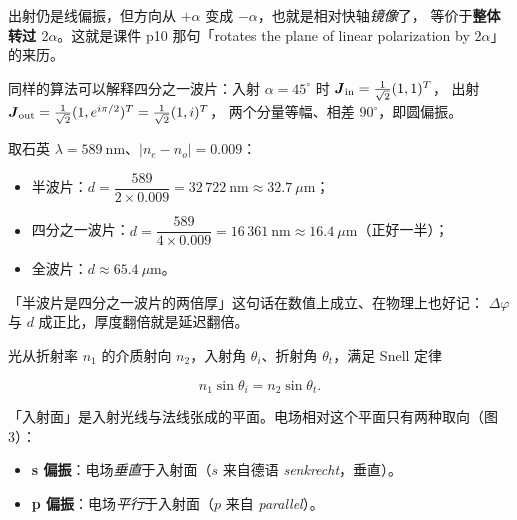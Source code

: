 \documentclass[11pt]{ctexart}
\let\subhdrtheme\subhdr
\renewcommand{\subhdr}[1]{\needspace{4\baselineskip}\subhdrtheme{#1}}
\let\hdrorig\hdr
\renewcommand{\hdr}[2]{\needspace{11\baselineskip}\hdrorig{#1}{#2}}
\begin{document}
出射仍是线偏振，但方向从 $+\alpha$ 变成 $-\alpha$，也就是相对快轴\emph{镜像}了，
等价于\textbf{整体转过 $2\alpha$}。这就是课件 p10 那句「rotates the plane of linear polarization
by $2\alpha$」的来历。

同样的算法可以解释四分之一波片：入射 $\alpha=45^\circ$ 时 $\boldsymbol{J}_{\text{in}}=\frac{1}{\sqrt2}(1,1)^{T}$，
出射 $\boldsymbol{J}_{\text{out}}=\frac{1}{\sqrt2}(1,e^{i\pi/2})^{T}=\frac{1}{\sqrt2}(1,i)^{T}$，
两个分量等幅、相差 $90^\circ$，即圆偏振。


取石英 $\lambda=589\ \mathrm{nm}$、$|n_e-n_o|=0.009$：

\begin{itemize}[leftmargin=1.6em]
\item 半波片：$d=\dfrac{589}{2\times0.009}=32\,722\ \mathrm{nm}\approx32.7\ \mu\mathrm{m}$；
\item 四分之一波片：$d=\dfrac{589}{4\times0.009}=16\,361\ \mathrm{nm}\approx16.4\ \mu\mathrm{m}$（正好一半）；
\item 全波片：$d\approx65.4\ \mu\mathrm{m}$。
\end{itemize}

「半波片是四分之一波片的两倍厚」这句话在数值上成立、在物理上也好记：
$\Delta\varphi$ 与 $d$ 成正比，厚度翻倍就是延迟翻倍。





光从折射率 $n_1$ 的介质射向 $n_2$，入射角 $\theta_i$、折射角 $\theta_t$，满足 Snell 定律

\[
n_1\sin\theta_i=n_2\sin\theta_t .
\]

「入射面」是入射光线与法线张成的平面。电场相对这个平面只有两种取向（图 3）：

\begin{itemize}[leftmargin=1.6em]
\item \textbf{s 偏振}：电场\emph{垂直}于入射面（$s$ 来自德语 \emph{senkrecht}，垂直）。
\item \textbf{p 偏振}：电场\emph{平行}于入射面（$p$ 来自 \emph{parallel}）。
\end{itemize}
\end{document}
